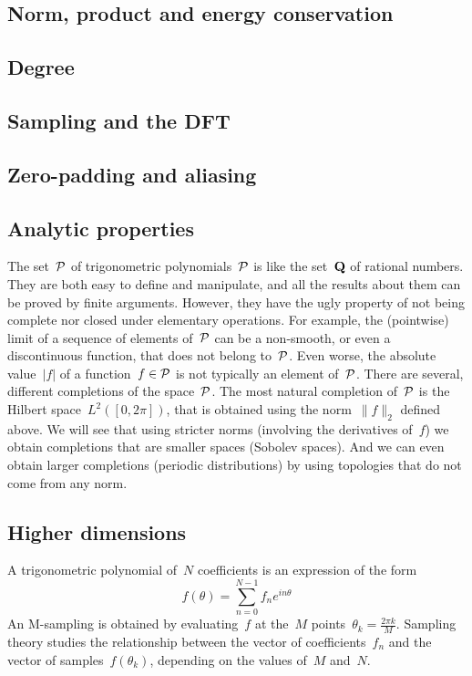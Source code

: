 \subsection{Norm, product and energy conservation}


\subsection{Degree}


\subsection{Sampling and the DFT}


\subsection{Zero-padding and aliasing}


\subsection{Analytic properties}

The set~$\mathcal{P}$ of trigonometric polynomials~$\mathcal{P}$ is like the set~$\mathbf{Q}$ of rational
numbers. They are both easy to define and manipulate, and all the results about
them can be proved by finite arguments.  However, they have the ugly property
of not being complete nor closed under elementary operations.  For example, the
(pointwise) limit of a sequence of elements of~$\mathcal{P}$ can be a non-smooth, or
even a discontinuous function, that does not belong to~$\mathcal{P}$.  Even worse, the
absolute value~$|f|$ of a function~$f\in\mathcal{P}$ is not typically an element
of~$\mathcal{P}$.  There are several, different completions of the space~$\mathcal{P}$.  The most
natural completion of~$\mathcal{P}$ is the Hilbert space~$L^2([0,2\pi])$, that is
obtained using the norm~$\|f\|_2$ defined above.  We will see that using
stricter norms (involving the derivatives of~$f$) we obtain completions that
are smaller spaces (Sobolev spaces).  And we can even obtain larger completions
(periodic distributions) by using topologies that do not come from any norm.


\subsection{Higher dimensions}

\clearpage
\thispagestyle{empty}

A trigonometric polynomial of~$N$ coefficients is an expression of the form
\[
	f(\theta)=\sum_{n=0}^{N-1} f_n e^{in\theta}
\]
An M-sampling is obtained by evaluating~$f$ at the~$M$
points~$\theta_k=\frac{2\pi k}{M}$.
Sampling theory studies the relationship between the vector of
coefficients~$f_n$ and the vector of samples~$f(\theta_k)$, depending on the
values of~$M$ and~$N$.

